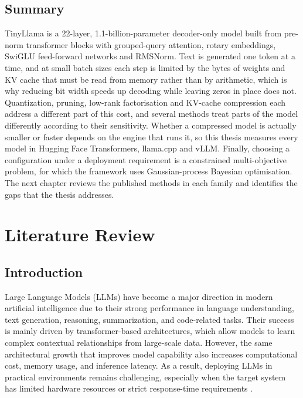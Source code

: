 \documentclass[
11pt, %
english, %
singlespacing, %
headsepline, %
]{MastersDoctoralThesis} %
\begin{document}
\section{Summary}
\label{sec:ch2-summary}

TinyLlama is a 22-layer, 1.1-billion-parameter decoder-only model built from pre-norm transformer blocks with grouped-query attention, rotary embeddings, SwiGLU feed-forward networks and RMSNorm. Text is generated one token at a time, and at small batch sizes each step is limited by the bytes of weights and KV cache that must be read from memory rather than by arithmetic, which is why reducing bit width speeds up decoding while leaving zeros in place does not. Quantization, pruning, low-rank factorisation and KV-cache compression each address a different part of this cost, and several methods treat parts of the model differently according to their sensitivity. Whether a compressed model is actually smaller or faster depends on the engine that runs it, so this thesis measures every model in Hugging Face Transformers, llama.cpp and vLLM. Finally, choosing a configuration under a deployment requirement is a constrained multi-objective problem, for which the framework uses Gaussian-process Bayesian optimisation. The next chapter reviews the published methods in each family and identifies the gaps that the thesis addresses.
\clearpage
\clearpage

\chapter{Literature Review}
\label{Chapter3}

\section{Introduction}
\label{sec:lr-intro}

Large Language Models (LLMs) have become a major direction in modern artificial intelligence due to their strong performance in language understanding, text generation, reasoning, summarization, and code-related tasks. Their success is mainly driven by transformer-based architectures, which allow models to learn complex contextual relationships from large-scale data. However, the same architectural growth that improves model capability also increases computational cost, memory usage, and inference latency. As a result, deploying LLMs in practical environments remains challenging, especially when the target system has limited hardware resources or strict response-time requirements \cite{survey2021transformers,survey2021ondevice}.
\end{document}
